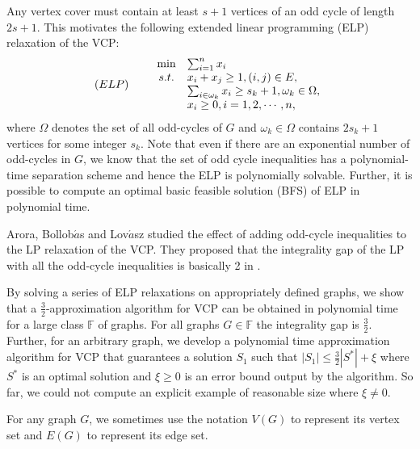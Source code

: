 \documentclass[12pt]{article}
\begin{document}
\vskip 5pt

Any vertex cover must contain at least $s+1$ vertices of an odd
cycle of length  $2s+1$. This motivates  the following extended
linear programming (ELP) relaxation  of the VCP:
\begin{equation}
\label{elp}(ELP) \hskip 10pt
\begin{array}{lcl}
&\min & \sum_{i=1}^nx_i \\
&s.t. & x_i+x_j\ge 1, (i,j)\in E,\\
 &    & \sum_{i\in \omega_k}x_i\ge s_k+1, \omega_k\in \Omega,\\
  &   &  x_i\ge 0, i=1,2,\cdots,n,
\end{array}
\end{equation}
where $\Omega$ denotes the set of all odd-cycles of  $G$ and
$\omega_k\in\Omega$ contains $2s_k+1$ vertices for some integer
$s_k$. Note that even if there are an exponential number of
odd-cycles in  $G$, we know that the set of odd cycle inequalities
has a polynomial-time separation scheme and hence the ELP is
polynomially solvable. Further, it is possible to compute an optimal
basic feasible solution (BFS) of ELP in polynomial time.

\vskip 5pt

Arora, Bollob$\acute{a}$s and Lov$\acute{a}$sz \cite{arora} studied
the effect of adding odd-cycle inequalities to the LP relaxation of
the VCP. They proposed that the integrality gap of the LP with all
the odd-cycle inequalities is basically 2 in \cite{arora}.

\vskip 5pt

By solving a series of ELP relaxations on appropriately defined
graphs, we show that a $\frac 3 2$-approximation algorithm for VCP
can be obtained in polynomial time for a large class $\mathbb{F}$ of
graphs.
For all
graphs $G\in \mathbb{F}$ the integrality gap is $\frac{3}{2}$.
Further, for an arbitrary graph, we develop a polynomial time
approximation algorithm for VCP that guarantees a solution $S_1$
such that $|S_1|\leq \frac{3}{2}|S^*|+\xi$ where $S^*$ is an optimal
solution and $\xi \geq 0$ is an error bound output by the algorithm.
So far, we could not compute an explicit example of reasonable size
 where $\xi \neq 0.$

\vskip 5pt

For any graph $G$, we sometimes use the notation $V(G)$ to represent
its vertex set and $E(G)$ to represent its edge set.
\end{document}
